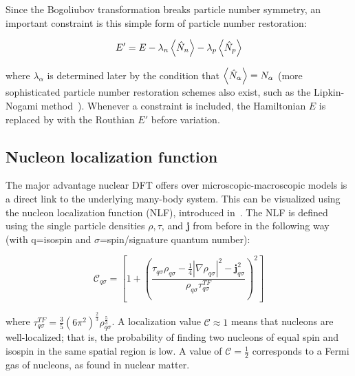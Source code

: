 \noindent Since the Bogoliubov transformation breaks particle number symmetry, an important constraint is this simple form of particle number restoration:

\begin{equation}
E' = E - \lambda_n \expval{\hat{N}_n} - \lambda_p \expval{\hat{N}_p}
\end{equation}

\noindent where $\lambda_\alpha$ is determined later by the condition that $\expval{\hat{N}_\alpha} = N_\alpha$ (more sophisticated particle number restoration schemes also exist, such as the Lipkin-Nogami method~\cite{Lipkin1960, Nogami1964, Pradhan1973, Flocard1997}). Whenever a constraint is included, the Hamiltonian $E$ is replaced by with the Routhian $E'$ before variation. %

\subsection{Nucleon localization function}\label{sect:locali}
The major advantage nuclear DFT offers over microscopic-macroscopic models is a direct link to the underlying many-body system. This can be visualized using the nucleon localization function (NLF), introduced in~\cite{Reinhard2011,Zhang2016}. The NLF is defined using the single particle densities $\rho, \tau$, and \textbf{j} from before in the following way (with q=isospin and $\sigma$=spin/signature quantum number):

\begin{equation}
\mathcal{C}_{q\sigma} = \left[1+\left(\frac{\tau_{q\sigma}\rho_{q\sigma}-\frac{1}{4}|\nabla\rho_{q\sigma}|^2-\mathbf{j}^2_{q\sigma}}{\rho_{q\sigma}\tau_{q\sigma}^{TF}}\right)^2\right]
\end{equation}

\noindent where $\tau_{q\sigma}^{TF}=\frac{3}{5}(6\pi^2)^\frac{2}{3}\rho_{q\sigma}^\frac{5}{3}$. A localization value $\mathcal{C} \approx 1$ means that nucleons are well-localized; that is, the probability of finding two nucleons of equal spin and isospin in the same spatial region is low. A value of $\mathcal{C}=\frac{1}{2}$ corresponds to a Fermi gas of nucleons, as found in nuclear matter.

